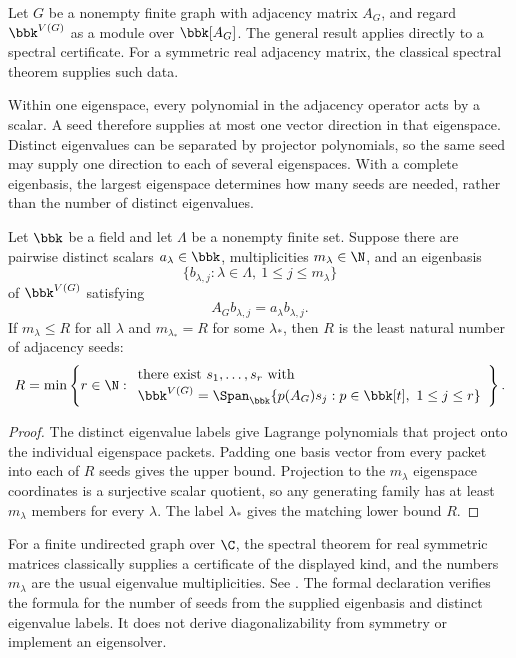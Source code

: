 Let $G$ be a nonempty finite graph with adjacency matrix $A_G$, and regard
$\bbk^{V(G)}$ as a module over $\bbk[A_G]$.  The general result applies directly to a spectral certificate. For a symmetric real adjacency matrix, the classical spectral theorem supplies such data.

Within one eigenspace, every polynomial in the adjacency operator acts by a scalar. A seed therefore supplies at most one vector direction in that eigenspace. Distinct eigenvalues can be separated by projector polynomials, so the same seed may supply one direction to each of several eigenspaces. With a complete eigenbasis, the largest eigenspace determines how many seeds are needed, rather than the number of distinct eigenvalues.

\begin{corollary}
\label{cor:graph-rank}
Let $\bbk$ be a field and let $\Lambda$ be a nonempty finite set.  Suppose
there are pairwise distinct scalars $a_{\lambda}\in\bbk$, multiplicities
$m_{\lambda}\in\N$, and an eigenbasis
\[
\{b_{\lambda,j}:\lambda\in\Lambda,\ 1\le j\le m_{\lambda}\}
\]
of $\bbk^{V(G)}$ satisfying
\[
A_Gb_{\lambda,j}=a_{\lambda}b_{\lambda,j}.
\]
If $m_{\lambda}\le R$ for all $\lambda$ and
$m_{\lambda_*}=R$ for some $\lambda_*$, then $R$ is the least natural number
of adjacency seeds:
\[
{
R=\min\left\{r\in\N:
\begin{array}{l}
\text{there exist }s_1,\ldots,s_r\text{ with}\\[2pt]
\bbk^{V(G)}=\Span_{\bbk}
  \{p(A_G)s_j:p\in\bbk[t],\ 1\le j\le r\}
\end{array}
\right\}.
}
\]
\end{corollary}

\begin{proof}
The distinct eigenvalue labels give Lagrange polynomials that project onto
the individual eigenspace packets.  Padding one basis vector from every
packet into each of $R$ seeds gives the upper bound.  Projection to the
$m_{\lambda}$ eigenspace coordinates is a surjective scalar quotient, so any
generating family has at least $m_{\lambda}$ members for every $\lambda$.
The label $\lambda_*$ gives the matching lower bound $R$.
\end{proof}

\begin{boundary}
For a finite undirected graph over $\C$, the spectral theorem for real symmetric matrices
classically supplies a certificate of the displayed kind, and the numbers
$m_{\lambda}$ are the usual eigenvalue multiplicities. See
\cite{brouwerHaemers2012}.  The formal declaration verifies the
formula for the number of seeds from the supplied eigenbasis and distinct eigenvalue
labels.  It does not derive diagonalizability from symmetry or implement an
eigensolver.
\end{boundary}

